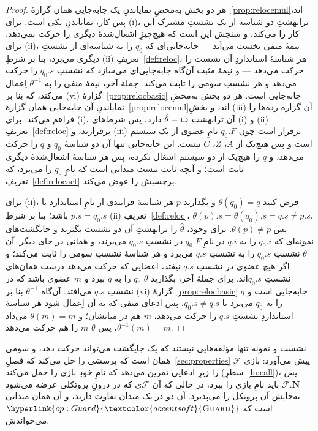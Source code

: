 \documentclass[10pt,oneside,openany]{book}
\newcommand{\admits}{\mathbf{N}}
\newcommand{\F}{\mathcal{F}}
\newcommand{\op}[1]{\textnormal{\textsc{#1}}}
\newcommand{\opl}[1]{\hyperlink{op:#1}{\textcolor{accentsoft}{\op{#1}}}}
\theoremstyle{accentdef}
\theoremstyle{accentplain}
\begin{document}
\begin{proof}
هر دو بخش به‌محضِ نمایاندنِ یک جابه‌جایی همان گزارهٔ~\ref{prop:relocemul}اند،
پس کار، نمایاندنِ یکی است. برای (i)، ترانهشتِ دو شناسه از یک نشستِ مشترک این
کار را می‌کند، و سنجش این است که هیچ‌چیزِ اشغال‌شدهٔ دیگری را حرکت نمی‌دهد.
برای (ii)، نیمهٔ منفی نخست می‌آید --- جابه‌جایی‌ای که $q_0$ را به شناسه‌ای از
نشستِ دیگری می‌برد، بنا بر شرطِ (ii)ِ تعریفِ~\ref{def:reloc}، \emph{هر}
شناسهٔ استانداردِ آن نشست را حرکت می‌دهد --- و نیمهٔ مثبت آن‌گاه جابه‌جایی‌ای
می‌سازد که نشستِ $q_0.s$ را حرکت می‌دهد و هر نشستِ سومی را ثابت می‌کند. جملهٔ
آخر، نیمهٔ منفی را به $\theta^{-1}$ اِعمال می‌کند، که بنا بر (vi)ِ
گزارهٔ~\ref{prop:relocbasic} جابه‌جایی است.
هر دو بخش به‌محضِ نمایاندنِ آن جابه‌جایی همان گزارهٔ~\ref{prop:relocemul}اند،
و بخشِ (iii)ِ آن گزاره رده‌ها را فراهم می‌کند. برای (i)، آن ترانهشت
$\hat\theta = \op{id}$ دارد، پس شرط‌های (i) و (ii)ِ تعریفِ~\ref{def:reloc}
برقرارند، و (iii) برقرار است چون $q_0.F$ نامِ عضوی از یک سیستم است و پس
هیچ‌یک از $A$، $Z$، $C$ نیست. این جابه‌جایی تنها آن دو شناسهٔ $q_0$ و $q$ را
حرکت می‌دهد، و $q$ را هیچ‌یک از دو سیستم اشغال نکرده، پس هر شناسهٔ اشغال‌شدهٔ
دیگری ثابت است؛ و آنچه ثابت نیست میدانی است که نامِ $q_0$ را می‌برد، که
تعریفِ~\ref{def:relocact} برچسبش را عوض می‌کند.

برای (ii)، فرض کنید $\theta(q_0) = q$ و بگذارید $p$ هر شناسهٔ فرایندی از نامِ
استاندارد با $p.s = q_0.s$ باشد؛ بنا بر شرطِ (ii)ِ تعریفِ~\ref{def:reloc}،
$\theta(p).s = \theta(q_0).s = q.s \neq p.s$، پس $\theta(p) \neq p$. برای
وجود، $\hat\theta$ را ترانهشتِ آن دو نشست بگیرید و جایگشت‌های نمونه‌ای که
$q_0.i$ را به $q.i$ در نامِ $q_0.F$ در نشستِ $q_0.s$ می‌برند، و همانی در جای
دیگر. آن $\theta$ نشستِ $q_0.s$ را به نشستِ $q.s$ می‌برد و هر شناسهٔ نشستِ
سومی را ثابت می‌کند؛ و اگر هیچ عضوی در نشستِ $q.s$ نیفتد، اعضایی که حرکت
می‌دهد درست همان‌های نشستِ $q_0.s$اند. برای جملهٔ آخر، بگذارید $\theta$
$q_0$ را به $q$ ببرد و $m$ عضوی باشد که در نشستِ $q.s$ می‌افتد. آن‌گاه
$\theta^{-1}$ بنا بر (vi)ِ گزارهٔ~\ref{prop:relocbasic} جابه‌جایی است و $q$
را به $q_0$ می‌برد با $q_0.s \neq q.s$، پس ادعای منفی که به آن اِعمال شود هر
شناسهٔ استانداردِ نشستِ $q.s$ را حرکت می‌دهد، $m$ هم در میانشان؛ و $\theta(m)
= m$ می‌داد $\theta^{-1}(m) = m$، پس $\theta$ $m$ را هم حرکت می‌دهد.
\end{proof}

نشست و نمونه تنها مؤلفه‌هایی نیستند که یک جایگشت می‌تواند حرکت دهد، و سومی
همان است که پرسشی را حل می‌کند که فصلِ~\ref{sec:properties} پیش می‌آورد:
بازی $\F$ را زیرِ ادعایی تمرین می‌دهد که نامِ خودِ بازی را حمل می‌کند
(سطرِ~\ref{ln:call})، پس $\F.\admits$ باید نامِ بازی را ببرد، در حالی که
آن $\F$ی که در درونِ پروتکلی عرضه می‌شود به‌جایش آن پروتکل را می‌پذیرد. آن دو
در یک میدان تفاوت دارند، و آن همان میدانی است که $\opl{Guard}$ می‌خواندش.
\end{document}
